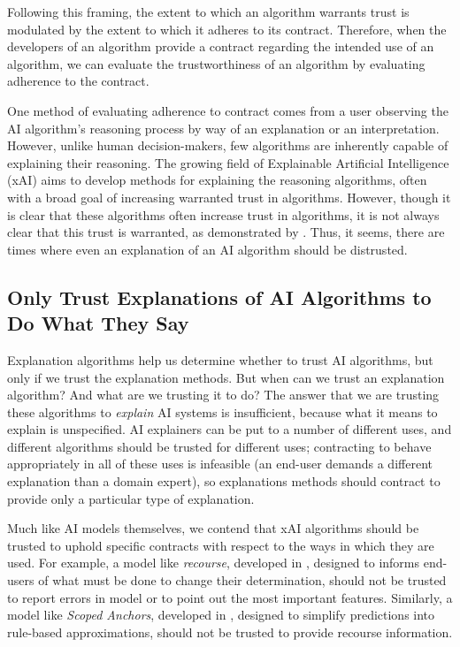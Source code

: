 Following this framing, the extent to which an algorithm warrants trust is modulated by the extent to which it adheres to its contract. Therefore, when the developers of an algorithm provide a contract regarding the intended use of an algorithm, we can evaluate the trustworthiness of an algorithm by evaluating adherence to the contract.

One method of evaluating adherence to contract comes from a user observing the AI algorithm's reasoning process by way of an explanation or an interpretation. However, unlike human decision-makers, few algorithms are inherently capable of explaining their reasoning. The growing field of Explainable Artificial Intelligence (xAI) aims to develop methods for explaining the reasoning algorithms, often with a broad goal of increasing warranted trust in algorithms. However, though it is clear that these algorithms often increase trust in algorithms, it is not always clear that this trust is warranted, as demonstrated by \textcite{jacobs_how_2021}. Thus, it seems, there are times where even an explanation of an AI algorithm should be distrusted.

\subsection{Only Trust Explanations of AI Algorithms to Do What They Say}
Explanation algorithms help us determine whether to trust AI algorithms, but only if we trust the explanation methods. But when can we trust an explanation algorithm? And what are we trusting it to do? The answer that we are trusting these algorithms to \emph{explain} AI systems is insufficient, because what it means to explain is unspecified. AI explainers can be put to a number of different uses, and different algorithms should be trusted for different uses; contracting to behave appropriately in all of these uses is infeasible (an end-user demands a different explanation than a domain expert), so explanations methods should contract to provide only a particular type of explanation.

Much like AI models themselves, we contend that xAI algorithms should be trusted to uphold specific contracts with respect to the ways in which they are used. For example, a model like \textit{recourse}, developed in \textcite{ustun_actionable_2019}, designed to informs end-users of what must be done to change their determination, should not be trusted to report errors in model or to point out the most important features. Similarly, a model like \textit{Scoped Anchors}, developed in \textcite{ribeiro_anchors_2018}, designed to simplify predictions into rule-based approximations, should not be trusted to provide recourse information.

